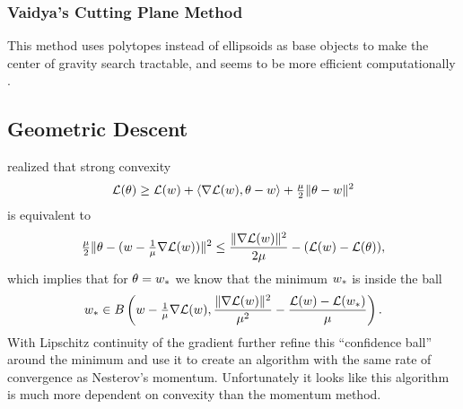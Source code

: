 \subsubsection{Vaidya's Cutting Plane Method}

This method uses polytopes instead of ellipsoids as base objects to make the
center of gravity search tractable, and seems to be more efficient
computationally \parencite[e.g.][Section
2.3]{bubeckConvexOptimizationAlgorithms2015}.

\subsection{Geometric Descent}

\textcite{bubeckGeometricAlternativeNesterov2015} realized that strong convexity
\begin{align*}
	\mathcal{L}(\theta)
	\ge \mathcal{L}(w) + \langle \nabla\mathcal{L}(w), \theta-w\rangle
	+ \tfrac{\mu}{2}\|\theta-w\|^2
\end{align*}
is equivalent to
\begin{align*}
	\tfrac{\mu}{2}\|\theta - (w - \tfrac1{\mu} \nabla\mathcal{L}(w))\|^2
	\le \frac{\|\nabla\mathcal{L}(w)\|^2}{2\mu} - (\mathcal{L}(w)-\mathcal{L}(\theta)),
\end{align*}
which implies that for \(\theta=w_*\) we know that the minimum
\(w_*\) is inside the ball
\begin{align*}
	w_*\in B\left(w- \tfrac1{\mu}\nabla\mathcal{L}(w), 
		\frac{\|\nabla\mathcal{L}(w)\|^2}{\mu^2}
		- \frac{ \mathcal{L}(w)-\mathcal{L}(w_*) }{\mu}
	\right).
\end{align*}
With Lipschitz continuity of the gradient \textcite{bubeckGeometricAlternativeNesterov2015}
further refine this ``confidence ball'' around the minimum and use it to create
an algorithm with the same rate of convergence as Nesterov's momentum.
Unfortunately it looks like this algorithm is much more dependent on
convexity than the momentum method.


\endinput
